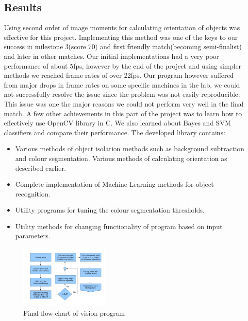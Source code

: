 \subsection{Results}
Using second order of image moments for calculating orientation of objects was effective for this project. Implementing this method was one of the keys to our success in milestone 3(score 70) and first friendly match(becoming semi-finalist) and later in other
matches. Our initial implementations had a very poor performance of about 5fps, however by the end of the project and using simpler methods we reached frame rates of over 22fps. Our program however suffered from major drops in frame rates on some specific machines in the lab, we could not successfully resolve the issue since the problem was not easily reproducible. This issue was one the major reasons we could not perform very well in the final match. 
A few other achievements in this part of the project was to learn how to effectively use OpenCV library in C. We also learned about Bayes and SVM classifiers and compare their performance.
The developed library contains:
\begin{itemize}
\item Various methods of object isolation methods such as background subtraction and colour segmentation. Various methods of calculating orientation as described earlier.
\item Complete implementation of Machine Learning methods for object recognition.
\item Utility programs for tuning the colour segmentation thresholds.
\item Utility methods for changing functionality of program based on input parameters.
\end{itemize}
\begin{figure}[htp]
\begin{center}
\leavevmode
\includegraphics[width=0.4\textwidth] {vision_stack.jpg}
\end{center}
\caption{Final flow chart of vision program}
\label{fig:Flow}
\end{figure}